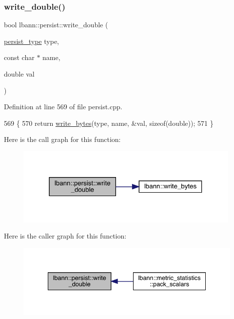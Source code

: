 \subsubsection{\texorpdfstring{write\+\_\+double()}{write\_double()}}
{\footnotesize\ttfamily bool lbann\+::persist\+::write\+\_\+double (\begin{DoxyParamCaption}\item[{\hyperlink{namespacelbann_adee41f31f15f3906cbdcce4a1417eb56}{persist\+\_\+type}}]{type,  }\item[{const char $\ast$}]{name,  }\item[{double}]{val }\end{DoxyParamCaption})}



Definition at line 569 of file persist.\+cpp.


\begin{DoxyCode}
569                                                                                \{
570   \textcolor{keywordflow}{return} \hyperlink{classlbann_1_1persist_a8729c7c90f4ca3090cd678fce91a0eb0}{write\_bytes}(type, name, &val, \textcolor{keyword}{sizeof}(\textcolor{keywordtype}{double}));
571 \}
\end{DoxyCode}
Here is the call graph for this function\+:\nopagebreak
\begin{figure}[H]
\begin{center}
\leavevmode
\includegraphics[width=315pt]{classlbann_1_1persist_ad29ebcbacdef90a91a9d474d4d6e1bcd_cgraph}
\end{center}
\end{figure}
Here is the caller graph for this function\+:\nopagebreak
\begin{figure}[H]
\begin{center}
\leavevmode
\includegraphics[width=335pt]{classlbann_1_1persist_ad29ebcbacdef90a91a9d474d4d6e1bcd_icgraph}
\end{center}
\end{figure}
\mbox{\label{classlbann_1_1persist_ab5be1e98f9d962c41fc9c3f2ac918c6e}} 

